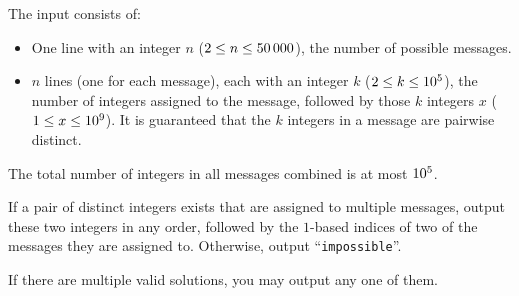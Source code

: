 \begin{Input}
    The input consists of:
    \begin{itemize}
        \item One line with an integer $n$ ($2\leq n\leq 50\,000$), the number of possible messages.
        \item $n$ lines (one for each message),
            each with an integer $k$ ($2\leq k\leq 10^5$), the number of integers assigned to the message,
            followed by those $k$ integers $x$ ($1\leq x\leq 10^9$).
            It is guaranteed that the $k$ integers in a message are pairwise distinct.
    \end{itemize}
    The total number of integers in all messages combined is at most $10^5$.
\end{Input}

\begin{Output}
    If a pair of distinct integers exists that are assigned to multiple messages,
    output these two integers in any order,
    followed by the $1$-based indices of two of the messages they are assigned to.
    Otherwise, output ``\texttt{impossible}''.

    If there are multiple valid solutions, you may output any one of them.
\end{Output}
